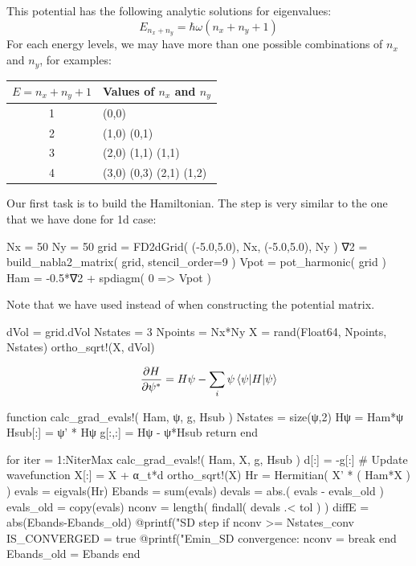 This potential has the following analytic solutions for eigenvalues:
\begin{equation}
E_{n_{x} + n_{y}} = \hbar \omega \left( n_{x} + n_{y} + 1 \right)
\end{equation}
For each energy levels, we may have more than one possible combinations
of $n_x$ and $n_y$, for examples:

\begin{table}[h]
\centering
\begin{tabular}{|c|l|}
\hline
$E = n_x + n_y + 1$  &  Values of $n_x$ and $n_y$ \\
\hline
1                  &  (0,0) \\
2                  &  (1,0) (0,1) \\
3                  &  (2,0) (1,1) (1,1) \\
4                  &  (3,0) (0,3) (2,1) (1,2) \\
\hline
\end{tabular}
\end{table}

Our first task is to build the Hamiltonian. The step is very similar
to the one that we have done for 1d case:
\begin{juliacode}
Nx = 50
Ny = 50
grid = FD2dGrid( (-5.0,5.0), Nx, (-5.0,5.0), Ny )
∇2 = build_nabla2_matrix( grid, stencil_order=9 )
Vpot = pot_harmonic( grid )
Ham = -0.5*∇2 + spdiagm( 0 => Vpot )
\end{juliacode}
Note that we have used  instead of
 when constructing the potential matrix.

\begin{juliacode}
dVol = grid.dVol
Nstates = 3
Npoints = Nx*Ny
X = rand(Float64, Npoints, Nstates)
ortho_sqrt!(X, dVol)
\end{juliacode}

\begin{equation}
\frac{\partial H}{\partial \psi^{*}} = H\psi -
\sum_{i} \psi \braket{\psi | H | \psi}
\end{equation}

\begin{juliacode}
function calc_grad_evals!( Ham, ψ, g, Hsub )
  Nstates = size(ψ,2)
  Hψ = Ham*ψ
  Hsub[:] = ψ' * Hψ
  g[:,:] = Hψ - ψ*Hsub
  return
end
\end{juliacode}



\begin{juliacode}
for iter = 1:NiterMax
  calc_grad_evals!( Ham, X, g, Hsub )
  d[:] = -g[:]
  # Update wavefunction
  X[:] = X + α_t*d
  ortho_sqrt!(X)
  Hr = Hermitian( X' * ( Ham*X ) )
  evals = eigvals(Hr)
  Ebands = sum(evals)
  devals = abs.( evals - evals_old )
  evals_old = copy(evals)
  nconv = length( findall( devals .< tol ) )
  diffE = abs(Ebands-Ebands_old)
  @printf("SD step %
  if nconv >= Nstates_conv
      IS_CONVERGED = true
      @printf("Emin_SD convergence: nconv = %
      break
  end
  Ebands_old = Ebands
end
\end{juliacode}


